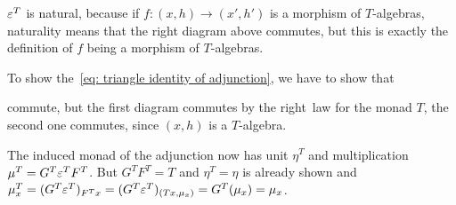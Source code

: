\begin{beweis}
\begin{itemize1}
\begin{figure}[H]
\begin{subfigure}{0.4\textwidth}
\end{subfigure}
\end{figure}
$\varepsilon^T$ is natural, because if $f \colon (x,h) \to (x',h')$
is a morphism of $T$-algebras, naturality means that the right diagram above commutes,
but this is exactly the definition of $f$ being a morphism of $T$-algebras.
\item To show the~\ref{eq: triangle identity of adjunction}, we have to show that 
\begin{figure}[H]
\centering
\begin{subfigure}{0.4\textwidth}
\centering
\end{subfigure}
\hspace{2em}
\begin{subfigure}{0.4\textwidth}
\centering
\end{subfigure}
\end{figure}
commute, but the first diagram commutes by the right~ law for the monad $T$, the
second one commutes, since $(x,h)$ is a $T$-algebra.
\item The induced monad of the adjunction now has unit $\eta^T$ and multiplication
$\mu^T = G^T \varepsilon^T F^T$. But $G^TF^T = T$ and $\eta^T = \eta$ is already shown and
$\mu^T_x = (G^T\varepsilon^{T})_{F^Tx} = (G^T\varepsilon^T)_{(Tx,\mu_x)} = G^T(\mu_x) = \mu_x$.
\end{itemize1}
\end{beweis}
